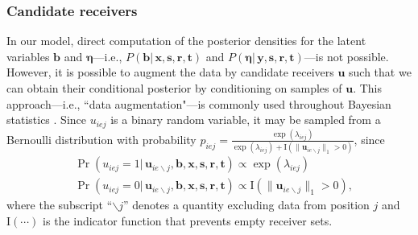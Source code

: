 \documentclass[ba]{imsart}
\numberwithin{equation}{section}
\theoremstyle{plain}
\begin{document}
	\subsubsection{Candidate receivers}
	In our model, direct computation of the posterior densities for the latent variables $\boldsymbol{b}$ and $\boldsymbol{\eta}$---i.e., $P(\boldsymbol{b}|\,\boldsymbol{x},\boldsymbol{s}, \boldsymbol{r},\boldsymbol{t})$ and $P(\boldsymbol{\eta}|\,\boldsymbol{y},\boldsymbol{s}, \boldsymbol{r},\boldsymbol{t})$---is not possible. However, it is possible to augment the data by candidate receivers $\boldsymbol{u}$ such that we can obtain their conditional posterior by conditioning on samples of $\boldsymbol{u}$. %
	This approach---i.e., ``data augmentation"---is commonly used throughout Bayesian statistics \citep{tanner1987calculation,neal2015exact}. Since $u_{iej}$ is a binary random variable, it may be sampled from a Bernoulli distribution with probability $p_{iej} =\frac{\exp(\lambda_{iej})}{\exp(\lambda_{iej})+\text{I}(\lVert\boldsymbol{u}_{ie\backslash j}\rVert_1 > 0 )}$, since
	\begin{equation}
		\begin{aligned}
			&\Pr(u_{iej}=1| \,\boldsymbol{u}_{ie\backslash j}, \boldsymbol{b}, \boldsymbol{x},\boldsymbol{s}, \boldsymbol{r},\boldsymbol{t}) \propto \exp(\lambda_{iej}) \\
			&\Pr(u_{iej}=0|\, \boldsymbol{u}_{ie\backslash j},\boldsymbol{b}, \boldsymbol{x},\boldsymbol{s}, \boldsymbol{r},\boldsymbol{t})\propto \text{I}(\lVert\boldsymbol{u}_{ie\backslash j}\rVert_1 > 0 ),
		\end{aligned}
		\label{eqn:latentreceiver}
	\end{equation}
	where the subscript ``$\backslash j$'' denotes a quantity excluding data from position $j$ and $\text{I}(\cdots)$ is the indicator function that prevents empty receiver sets. 
\end{document}
